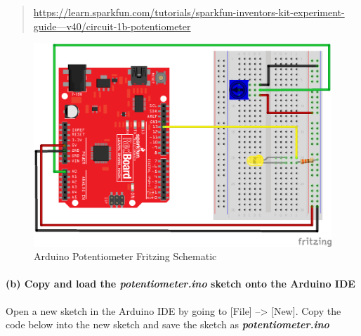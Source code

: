 \documentclass[11pt]{article}
\begin{document}
\begin{quote}
\href{https://learn.sparkfun.com/tutorials/sparkfun-inventors-kit-experiment-guide---v40/circuit-1b-potentiometer}{https://learn.sparkfun.com/tutorials/sparkfun-inventors-kit-experiment-guide---v40/circuit-1b-potentiometer}
\end{quote}

\begin{figure}
\centering
\includegraphics{images/redboard_pot_led_fritzing.png}
\caption{Arduino Potentiometer Fritzing Schematic}
\end{figure}

    \hypertarget{b-copy-and-load-the-potentiometer.ino-sketch-onto-the-arduino-ide}{%
\paragraph{\texorpdfstring{(b) Copy and load the
\textbf{\emph{potentiometer.ino}} sketch onto the Arduino
IDE}{(b) Copy and load the potentiometer.ino sketch onto the Arduino IDE}}\label{b-copy-and-load-the-potentiometer.ino-sketch-onto-the-arduino-ide}}

Open a new sketch in the Arduino IDE by going to {[}File{]}
--\textgreater{} {[}New{]}. Copy the code below into the new sketch and
save the sketch as \textbf{\emph{potentiometer.ino}}
\end{document}
